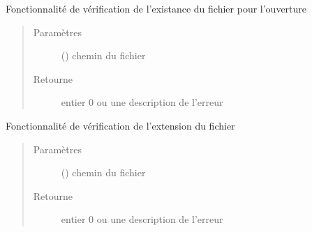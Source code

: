 \documentclass[letterpaper,10pt,french]{sphinxmanual}
\begin{document}
\begin{fulllineitems}
\label{\detokenize{verificationFormatFichier:chargement_des_donnees.verificationFormatFichier.verifOuverture}}
Fonctionnalité de vérification de l’existance du fichier pour l’ouverture
\begin{quote}\begin{description}
\item[{Paramètres}] \leavevmode
{} () \textendash{} chemin du fichier

\item[{Retourne}] \leavevmode
entier 0 ou une description de l’erreur

\end{description}\end{quote}

\end{fulllineitems}


\begin{fulllineitems}
\label{\detokenize{verificationFormatFichier:chargement_des_donnees.verificationFormatFichier.verifExtension}}
Fonctionnalité de vérification de l’extension du fichier
\begin{quote}\begin{description}
\item[{Paramètres}] \leavevmode
{} () \textendash{} chemin du fichier

\item[{Retourne}] \leavevmode
entier 0 ou une description de l’erreur

\end{description}\end{quote}

\end{fulllineitems}

\end{document}
